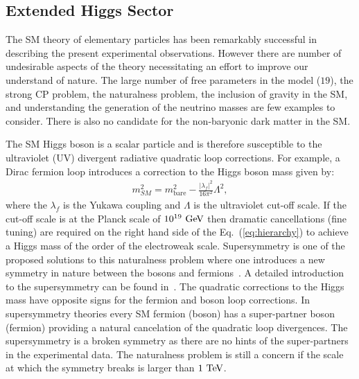 \subsection{Extended Higgs Sector}

The SM theory of elementary particles has been remarkably successful in describing the present experimental observations. However there are number of undesirable aspects of the theory necessitating an effort to improve our understand of nature. The large number of free parameters in the model ($19$), the strong CP problem, the naturalness problem, the inclusion of gravity in the SM, and understanding the generation of the neutrino masses are few examples to consider. There is also no candidate for the non-baryonic dark matter in the SM. 

The SM Higgs boson is a scalar particle and is therefore susceptible to the ultraviolet (UV) divergent radiative quadratic loop corrections. For example, a Dirac fermion loop introduces a correction to the Higgs boson mass given by:
\begin{eqnarray} \label{eq:hierarchy}
m^{2}_{SM} = m^2_{\mathrm{bare}} - \frac{|\lambda_f|^2}{16\pi^2} \Lambda^2, 
\end{eqnarray}
where the $\lambda_f$ is the Yukawa coupling and $\Lambda$ is the ultraviolet cut-off scale. If the cut-off scale is at the Planck scale of $10^{19}~\mathrm{Ge\kern -0.1em V}$  then dramatic cancellations (fine tuning) are required on the right hand side of the Eq.~(\ref{eq:hierarchy}) to achieve a Higgs mass of the order of the electroweak scale. Supersymmetry is one of the proposed solutions to this naturalness problem where one introduces a new symmetry in nature between the bosons and fermions~\cite{Golfand:1971iw,Wess:1974tw}. A detailed introduction to the supersymmetry can be found in~\cite{Martin:1997ns}. The quadratic corrections to the Higgs mass have opposite signs for the fermion and boson loop corrections. In supersymmetry theories every SM fermion (boson) has a super-partner boson (fermion) providing a natural cancelation of the quadratic loop divergences. The supersymmetry is a broken symmetry as there are no hints of the super-partners in the experimental data. The naturalness problem is still a concern if the scale at which the symmetry breaks is larger than $1~\mathrm{Te\kern -0.1em V}$.  

